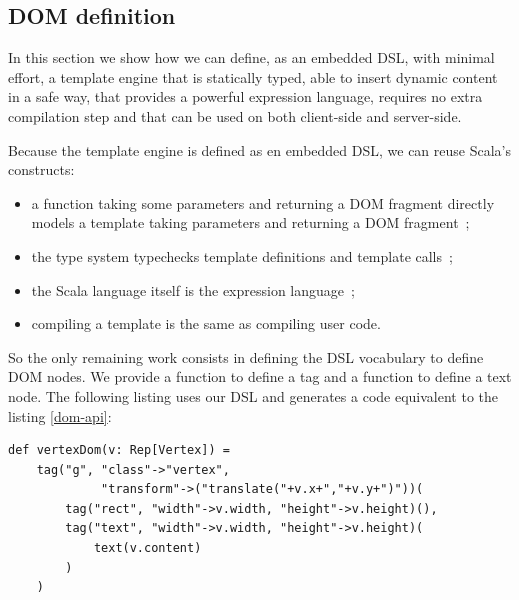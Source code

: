 \documentclass[american,english,runningheads]{llncs}
\begin{document}


\subsection{DOM definition}

In this section we show how we can define, as an embedded DSL, with minimal effort, a template engine that is
statically typed, able to insert dynamic content in a safe way, that provides a powerful expression language,
requires no extra compilation step and that can be used on both client-side and server-side.

Because the template engine is defined as en embedded DSL, we can reuse Scala’s constructs:

\begin{itemize}
\item a function taking some parameters and returning a DOM fragment directly models a template taking parameters and
returning a DOM fragment~;
\item the type system typechecks template definitions and template calls~;
\item the Scala language itself is the expression language~;
\item compiling a template is the same as compiling user code.
\end{itemize}

So the only remaining work consists in defining the DSL vocabulary to define DOM nodes. We provide a 
function to define a tag and a  function to define a text node. The following listing uses our DSL and
generates a code equivalent to the listing \ref{dom-api}:

\begin{lstlisting}[label=forest-hello,caption=DOM definition DSL]
def vertexDom(v: Rep[Vertex]) =
    tag("g", "class"->"vertex",
             "transform"->("translate("+v.x+","+v.y+")"))(
        tag("rect", "width"->v.width, "height"->v.height)(),
        tag("text", "width"->v.width, "height"->v.height)(
            text(v.content)
        )
    )
\end{lstlisting}
\end{document}
